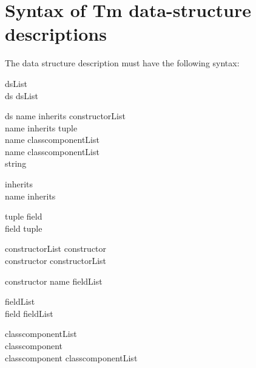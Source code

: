 \chapter{Syntax of Tm data-structure descriptions}
\label{s.dsgram}
The data structure description must have the following syntax:
\begin{production}{dsList}
\emptystring \\
ds dsList \\
\end{production}

\begin{production}{ds}
name \term{::=} inherits constructorList \term{;} \\
name \term{==} inherits \term{(} tuple \term{)} \term{;} \\
name \term{=} classcomponentList \term{;} \\
name \term{~=} classcomponentList \term{;} \\
 string \term{;} \\
\end{production}

\begin{production}{inherits}
\emptystring \\
name \term{+} inherits \\
\end{production}

\begin{production}{tuple}
field \\
field \term{,} tuple \\
\end{production}

\begin{production}{constructorList}
constructor  \\
constructor \term{|} constructorList  \\
\end{production}

\begin{production}{constructor}
name fieldList \\
\end{production}

\begin{production}{fieldList}
\emptystring \\
field fieldList  \\
\end{production}

\begin{production}{classcomponentList}
\emptystring \\
classcomponent \\
classcomponent \term{+} classcomponentList \\
\end{production}


